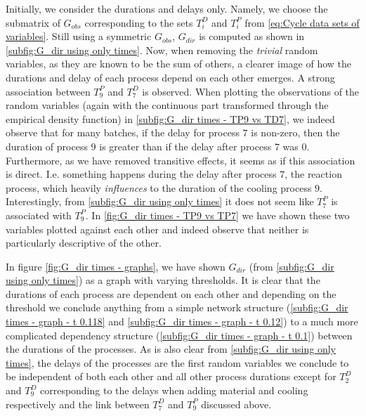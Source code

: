 \documentclass[../Thesis.tex]{subfiles}
\begin{document}
Initially, we consider the durations and delays only. Namely, we choose the submatrix of $G_{obs}$ corresponding to the sets $T^D_i$ and $T^P_i$ from \autoref{eq:Cycle data sets of variables}. Still using a symmetric $G_{obs}$, $G_{dir}$ is computed as shown in \autoref{subfig:G_dir using only times}. Now, when removing the \textit{trivial} random variables, as they are known to be the sum of others, a clearer image of how the durations and delay of each process depend on each other emerges. A strong association between $T^P_9$ and $T^D_7$ is observed. When plotting the observations of the random variables (again with the continuous part transformed through the empirical density function) in \autoref{subfig:G_dir times - TP9 vs TD7}, we indeed observe that for many batches, if the delay for process $7$ is non-zero, then the duration of process $9$ is greater than if the delay after process $7$ was $0$. Furthermore, as we have removed transitive effects, it seems as if this association is direct. I.e. something happens during the delay after process $7$, the reaction process, which heavily \textit{influences} to the duration of the cooling process $9$. Interestingly, from \autoref{subfig:G_dir using only times} it does not seem like $T^P_7$ is associated with $T^P_9$. In \autoref{fig:G_dir times - TP9 vs TP7} we have shown these two variables plotted against each other and indeed observe that neither is particularly descriptive of the other.


In figure \autoref{fig:G_dir times - graphs}, we have shown $G_{dir}$ (from \autoref{subfig:G_dir using only times}) as a graph with varying thresholds. It is clear that the durations of each process are dependent on each other and depending on the threshold we conclude anything from a simple network structure (\autoref{subfig:G_dir times - graph - t 0.118} and \autoref{subfig:G_dir times - graph - t 0.12}) to a much more complicated dependency structure (\autoref{subfig:G_dir times - graph - t 0.1}) between the durations of the processes. As is also clear from \autoref{subfig:G_dir using only times}, the delays of the processes are the first random variables we conclude to be independent of both each other and all other process durations except for $T^D_2$ and $T^D_9$ corresponding to the delays when adding material and cooling respectively and the link between $T^D_7$ and $T^P_9$ discussed above.
\end{document}
